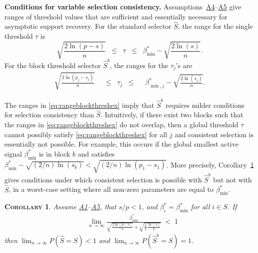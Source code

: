 \documentclass[bj,authoryear]{imsart}
\theoremstyle{plain}
\newtheorem{cor}[thm]{\textsc{Corollary}}
\begin{document}
\noindent\textbf{Conditions for variable selection consistency.} 
Assumptions~\hyperlink{lab:A4}{A4}--\hyperlink{lab:A5}{A5} give ranges of threshold values that are sufficient and essentially necessary for asymptotic support recovery. For the standard selector $\hat{S}$, the range for the single threshold $\tau$ is
\begin{equation}\label{eq:rangethreshex}
  \sqrt{\frac{2\ln(p-s)}{n}}\;\;\leq\;\;\tau\;\;\leq\;\;\beta^*_{\min}-\sqrt{\frac{2\ln(s)}{n}}.	
\end{equation}
For the block threshold selector $\hat{S}^{b}$, 
the ranges for the $\tau_j$'s are
    \begin{eqnarray}\label{eq:rangeblockthreshex}
  \sqrt{\frac{2\ln(p_j-s_j)}{n}}\;\;&\leq\;\;\tau_j\;\;\leq&\;\;\beta^*_{\min,j}-\sqrt{\frac{2\ln(s_j)}{n}}   .
    \end{eqnarray}

The ranges in \eqref{eq:rangeblockthreshex} imply that $\hat{S}^{b}$ requires milder conditions for selection consistency than $\hat{S}$. Intuitively, if there exist two blocks such that the ranges in \eqref{eq:rangeblockthreshex} do not overlap, 
then a global threshold $\tau$ cannot possibly satisfy \eqref{eq:rangeblockthreshex} for all $j$ and consistent selection is essentially not possible.
For example, this occurs if the global smallest active signal $\beta_{\min}^*$ is in block $b$ and satisfies  $\beta_{\min}^* - \sqrt{(2/n) \ln(s_b)} < \sqrt{(2/n) \ln(p_1-s_1)}$.
More precisely, Corollary~\ref{cor:selconstimpossible} gives
conditions under which consistent selection is possible with $\hat{S}^b$ but not with $\hat{S}$, in a worst-case setting where all non-zero parameters are equal to $\beta_{\min}^*$.


\begin{cor}\label{cor:selconstimpossible}
Assume \hyperlink{lab:A1}{A1}--\hyperlink{lab:A5}{A5}, that $s/p<1$, and $\beta^*_i=\beta_{\min}^*$ for all $i \in S$. If
\begin{eqnarray*}
    &\lim_{n\to \infty}\frac{\beta_{\min}^*}{\sqrt{\tfrac{2\ln(p-s)}{n}}+\sqrt{\tfrac{\pi}{2}\tfrac{\ln(s)}{n}}}\;<\; 1 
\end{eqnarray*}
then 
$\lim_{n \rightarrow \infty} P(\hat{S} = S) < 1$ and $\lim_{n \rightarrow \infty} P(\hat{S}^{b} = S)=1$.
\end{cor}
\end{document}

